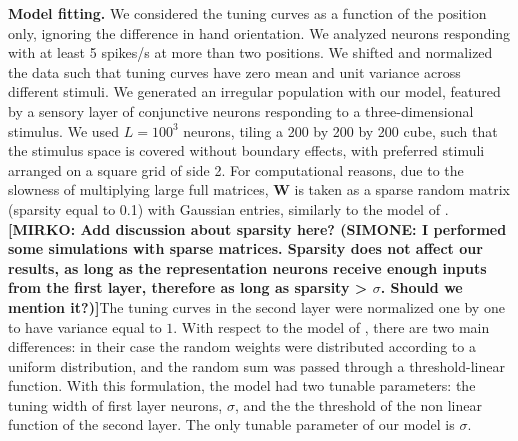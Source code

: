 \documentclass[a4paper]{article}%
\begin{document}
\textbf{Model fitting.} We considered the tuning curves as a function of the
position only, ignoring the difference in hand orientation. We analyzed
neurons responding with at least 5 spikes/s at more than two positions. We
shifted and normalized the data such that tuning curves have zero mean and
unit variance across different stimuli. We generated an irregular population
with our model, featured by a sensory layer of conjunctive neurons responding
to a three-dimensional stimulus. We used $L= 100^{3}$ neurons, tiling a 200 by
200 by 200 cube, such that the stimulus space is covered without boundary
effects, with preferred stimuli arranged on a square grid of side 2. For
computational reasons, due to the slowness of multiplying large full matrices, $\mathbf{W}$ is taken as a sparse random matrix (sparsity
equal to 0.1) with Gaussian entries, similarly to the model of \cite{Lalazar2016TuningConnectivity}. \textbf{[MIRKO: Add discussion about sparsity here? (SIMONE: I performed some simulations with sparse matrices. Sparsity does not affect our results, as long as the representation neurons receive enough inputs from the first layer, therefore as long as sparsity > $\sigma$. Should we mention it?)]}The tuning curves in the second layer
were normalized one by one to have variance equal to $1$. With respect to the
model of \cite{Lalazar2016TuningConnectivity}, there are two main differences:
in their case the random weights were distributed according to a uniform
distribution, and the random sum was passed through a threshold-linear
function. With this formulation, the model had two tunable parameters: the
tuning width of first layer neurons, $\sigma$, and the the threshold of the
non linear function of the second layer. The only tunable parameter of our
model is $\sigma$.
\end{document}
